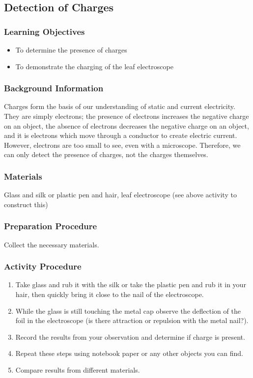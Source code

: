 \subsection{Detection of Charges}

\subsubsection*{Learning Objectives}
\begin{itemize}
\item{To determine the presence of charges} 
\item{To demonstrate the charging of the leaf electroscope} 
\end{itemize}

\subsubsection*{Background Information}
Charges form the basis of our understanding of static and current electricity. They are simply electrons; the presence of electrons increases the negative charge on an object, the absence of electrons decreases the negative charge on an object, and it is electrons which move through a conductor to create electric current. However, electrons are too small to see, even with a microscope. Therefore, we can only detect the presence of charges, not the charges themselves.

\subsubsection*{Materials}
Glass and silk or plastic pen and hair, leaf electroscope (see above activity to construct this)

\subsubsection*{Preparation Procedure}
Collect the necessary materials.

\subsubsection*{Activity Procedure}
\begin{enumerate}
\item{Take glass and rub it with the silk or take the plastic pen and rub it in your hair, then quickly bring it close to the nail of the electroscope.}
\item{While the glass is still touching the metal cap observe the deflection of the foil in the electroscope  (is there attraction or repulsion with the metal nail?).} 
\item{Record the results from your observation and determine if charge is present.} 
\item{Repeat these steps using notebook paper or any other objects you can find.} 
\item{Compare results from different materials.}
\end{enumerate}

